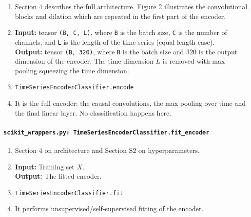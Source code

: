 \documentclass[a4paper,11pt]{article}
\newcommand{\code}[1]{\texttt{#1}}
\begin{document}
\begin{enumerate}[label=(\roman*)]
\item Section 4 describes the full architecture. Figure 2 illustrates the convolutional blocks and dilation which are repeated in the first part of the encoder.
\item 
    \textbf{Input:} tensor \texttt{(B, C, L)}, where \texttt{B} is the batch size, \texttt{C} is the number of channels, and \texttt{L} is the length of the time series (equal length case).\\
    \textbf{Output:} tensor \texttt{(B, 320)}, where \texttt{B} is the batch size and 320 is the output dimension of the encoder. The time dimension $L$ is removed with max pooling squeezing the time dimension.
\item \texttt{TimeSeriesEncoderClassifier.encode}
\item It is the full encoder: the causal convolutions, the max pooling over time and the final linear layer. No classification happens here.
\end{enumerate}

\paragraph{\code{scikit\_wrappers.py: TimeSeriesEncoderClassifier.fit\_encoder}}
\begin{enumerate}[label=(\roman*)]
\item Section 4 on architecture and Section S2 on hyperparameters.
\item 
    \textbf{Input:} Training set $X$.\\
    \textbf{Output:} The fitted encoder.
\item \texttt{TimeSeriesEncoderClassifier.fit}
\item It performs unsupervised/self-supervised fitting of the encoder.
\end{enumerate}
\end{document}
